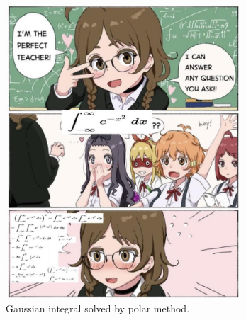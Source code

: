 \documentclass[../../main.tex]{subfiles}
\begin{document}
\begin{figure}
    \centering
    \includegraphics[width=0.78\textwidth]{../../Rss/SFunc/9az27w9ge34e1.jpg}
    \caption{Gaussian integral solved by polar method.}
    \label{fig}
\end{figure}
\end{document}
